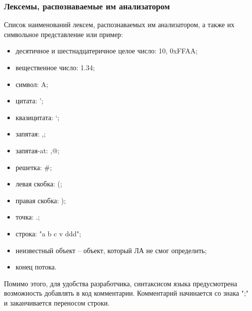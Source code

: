 \subsubsection{Лексемы, распознаваемые им анализатором}

Список наименований лексем, распознаваемых им анализатором, а также их символьное представление или пример:
\begin{itemize}
	\item десятичное и шестнадцатеричное целое число: 10, 0xFFAA;
	\item вещественное число: 1.34;
	\item символ: A;
	\item цитата: ';
	\item квазицитата: `;
	\item запятая: ,;
	\item запятая-at: ,@;
	\item решетка: \#;
	\item левая скобка: (;
	\item правая скобка: );
	\item точка: .;
	\item строка: "a b c v ddd";
	\item неизвестный объект -- объект, который ЛА не смог определить;
	\item конец потока.
\end{itemize}

Помимо этого, для удобства разработчика, синтаксисом языка предусмотрена возможность добавлять в код комментарии. Комментарий начинается со знака ‭";" и заканчивается переносом строки.


